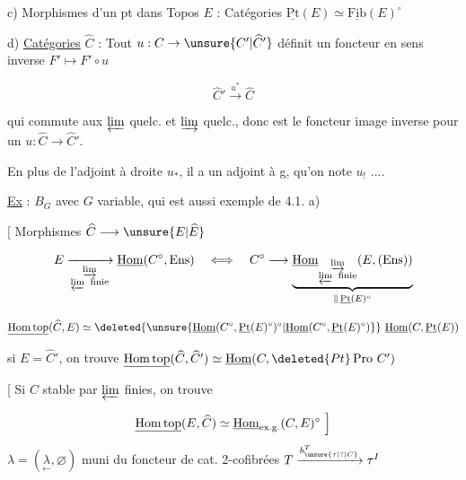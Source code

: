 c) Morphismes d'un pt dans Topos $E$ : Catégories $\underline{\mathrm{Pt}}(E)\simeq\underline{\mathrm{Fib}}(E)^\circ$

d) \uline{Catégories} $\widehat C$ : Tout   $u:C\to\unsure{C'|\widehat C'}$ définit un foncteur  en sens inverse  $F'\mapsto F'\circ u$

\[\widehat C'\xrightarrow{u^*}\widehat C\]

 qui commute   aux $\varprojlim$ quelc. et  $\varinjlim$ quelc., donc est le foncteur image inverse pour un $u:\widehat C\longrightarrow\widehat C'$. 


En plus de l'adjoint à droite $u_*$, il a un adjoint à g, qu'on note $u_!$ ....

\uline{Ex} : $B_G$ avec $G$ variable, qui est aussi exemple de 4.1. a)

 [ Morphismes  $\widehat C\longrightarrow\unsure{E|\widehat E}$

\[E\xrightarrow[\substack{\varinjlim\\\varprojlim\ \mathrm{finie}}]{}\underline{\mathrm{Hom}}(C^\circ,\mathrm{Ens})\quad\Longleftrightarrow\quad C^\circ\longrightarrow\underbrace{\underline{\mathrm{Hom}}_{\substack{\varinjlim\\\varprojlim\ \mathrm{finie}}}(E,(\mathrm{Ens}))}_{\parallel\,\underline{\mathrm{Pt}}(E)^\circ}\]

\[\underline{\mathrm{Hom\,top}}(\widehat C,E)\simeq\deleted{\unsure{\underline{\mathrm{Hom}}(C^\circ,\underline{\mathrm{Pt}}(E)^\circ)^\circ|\underline{\mathrm{Hom}}(C^\circ,\underline{\mathrm{Pt}}(E)^\circ)}}\ \underline{\mathrm{Hom}}(C,\underline{\mathrm{Pt}}(E))\]

si $E=\widehat C'$, on trouve $\underline{\mathrm{Hom\,top}}(\widehat C,\widehat C')\simeq\underline{\mathrm{Hom}}(C,\deleted{Pt}\operatorname{Pro}\,C')$ 

[ Si $C$ stable par $\varprojlim$ finies, on trouve

\[\underline{\mathrm{Hom\,top}}(E,\widehat C)\simeq\underline{\mathrm{Hom}}_{\mathrm{ex.g.}}(C,E)^\circ\ \Bigr]\vphantom{\widehat C}\]
$\lambda=(\underset{\leftarrow}{\lambda},\varnothing)$ \qquad muni du foncteur de cat. 2-cofibrées $T\xrightarrow{b^T_{\unsure{\tau|?|C}}}\tau^I$


